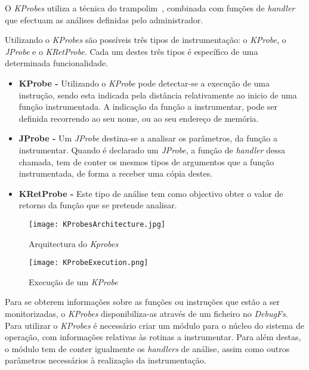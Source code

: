 O \textit{KProbes} utiliza a técnica do trampolim~\cite{Hollingsworth94dynamicprogram}, combinada com funções de \textit{handler} que efectuam as análises definidas pelo administrador.

Utilizando o \textit{KProbes} são possíveis três tipos de instrumentação: o \textit{KProbe}, o \textit{JProbe} e o \textit{KRetProbe}.
Cada um destes três tipos é específico de uma determinada funcionalidade.

\begin{itemize}
 \item \textbf{KProbe - } Utilizando o \textit{KProbe} pode detectar-se a execução de uma instrução, sendo esta indicada pela distância relativamente ao inicio de uma função instrumentada.
A indicação da função a instrumentar, pode ser definida recorrendo ao seu nome, ou ao seu endereço de memória.

\item \textbf{JProbe - } Um \textit{JProbe} destina-se a analisar os parâmetros, da função a instrumentar.
Quando é declarado um \textit{JProbe}, a função de \textit{handler} dessa chamada, tem de conter os mesmos tipos de argumentos que a função instrumentada, de forma a receber uma cópia destes.
 
 \item \textbf{KRetProbe - } Este tipo de análise tem como objectivo obter o valor de retorno da função que se pretende analisar.

\end{itemize}

\begin{figure}[!htb]
       \centering
       \texttt{[image: KProbesArchitecture.jpg]}
       \caption{Arquitectura do \textit{Kprobes} \cite{KProbesLwn}}
	\label{fig:kprobes_arch}
\end{figure}

\begin{figure}[!htb]
       \centering
       \texttt{[image: KProbeExecution.png]}
       \caption{Execução de um \textit{KProbe} \cite{KProbesLwn}}
	\label{fig:kprobe_execution}
\end{figure}

Para se obterem informações sobre as funções ou instruções que estão a ser monitorizadas, o \textit{KProbes} disponibiliza-as através de um ficheiro no \textit{DebugFs}.
Para utilizar o \textit{KProbes} é necessário criar um módulo para o núcleo do sistema de operação, com informações relativas às rotinas a instrumentar.
Para além destas, o módulo tem de conter igualmente os \textit{handlers} de análise, assim como outros parâmetros necessários à realização da instrumentação.


